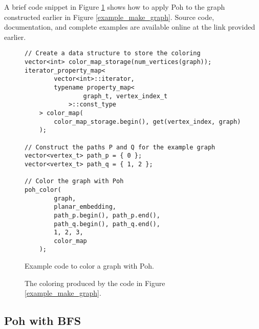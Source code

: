 \documentclass[letterpaper, 12pt]{article}
\theoremstyle{definition}
\theoremstyle{definition}
\theoremstyle{thm}
\theoremstyle{definition}
\begin{document}
A brief code snippet in Figure \ref{example_poh} shows how to apply Poh to the
graph constructed earlier in Figure \ref{example_make_graph}.
Source code, documentation, and complete examples are available online at the
link provided earlier.

\begin{figure}
\begin{lstlisting}[frame=single]
// Create a data structure to store the coloring
vector<int> color_map_storage(num_vertices(graph));
iterator_property_map<
        vector<int>::iterator,
        typename property_map<
                graph_t, vertex_index_t
            >::const_type
    > color_map(
        color_map_storage.begin(), get(vertex_index, graph)
    );

// Construct the paths P and Q for the example graph
vector<vertex_t> path_p = { 0 };
vector<vertex_t> path_q = { 1, 2 };

// Color the graph with Poh
poh_color(
        graph,
        planar_embedding,
        path_p.begin(), path_p.end(),
        path_q.begin(), path_q.end(),
        1, 2, 3,
        color_map
    );
\end{lstlisting}
\caption{Example code to color a graph with Poh.}
\label{example_poh}
\end{figure}

\begin{figure}
\begin{center}
\end{center}
\caption{The coloring produced by the code in Figure \ref{example_make_graph}.}
\end{figure}

\subsection{Poh with BFS}
\end{document}
